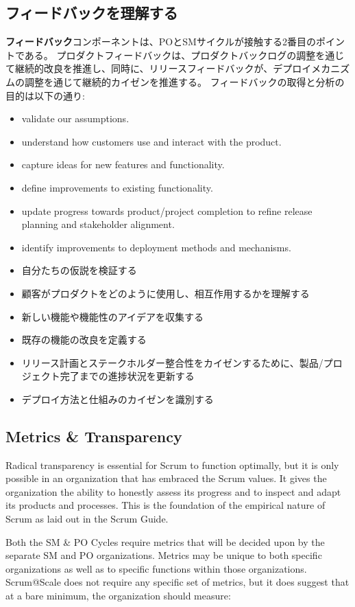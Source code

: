 \documentclass[12pt,a4paper,parskip=full]{scrartcl}
\begin{document}
\subsection{フィードバックを理解する}
\textbf{フィードバック}コンポーネントは、POとSMサイクルが接触する2番目のポイントである。
プロダクトフィードバックは、プロダクトバックログの調整を通じて継続的改良を推進し、同時に、リリースフィードバックが、デプロイメカニズムの調整を通じて継続的カイゼンを推進する。
フィードバックの取得と分析の目的は以下の通り:
\begin{itemize}
\item validate our assumptions.
\item understand how customers use and interact with the product.
\item capture ideas for new features and functionality.
\item define improvements to existing functionality.
\item update progress towards product/project completion to refine release
planning and stakeholder alignment.
\item identify improvements to deployment methods and mechanisms.
\end{itemize}
\fi
\begin{itemize}
\item 自分たちの仮説を検証する
\item 顧客がプロダクトをどのように使用し、相互作用するかを理解する
\item 新しい機能や機能性のアイデアを収集する
\item 既存の機能の改良を定義する
\item リリース計画とステークホルダー整合性をカイゼンするために、製品/プロジェクト完了までの進捗状況を更新する
\item デプロイ方法と仕組みのカイゼンを識別する
\end{itemize}

\subsection{Metrics \& Transparency}
Radical transparency is essential for Scrum to function optimally, but it
is only possible in an organization that has embraced the Scrum values. It
gives the organization the ability to honestly assess its progress and to
inspect and adapt its products and processes. This is the foundation of the
empirical nature of Scrum as laid out in the Scrum Guide.

Both the SM \& PO Cycles require metrics that will be decided upon by the
separate SM and PO organizations. Metrics may be unique to both specific
organizations as well as to specific functions within those organizations.
Scrum@Scale does not require any specific set of metrics, but it does
suggest that at a bare minimum, the organization should measure:
\fi
\end{document}
